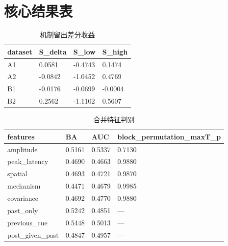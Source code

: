 \documentclass[UTF8,a4paper,11pt]{ctexart}
\begin{document}
\section{核心结果表}

\begin{longtable}{llll}

\caption{机制留出差分收益}\\\toprule

dataset & S\_delta & S\_low & S\_high\\\midrule

A1 & 0.0581 & -0.4743 & 0.1474\\

A2 & -0.0842 & -1.0452 & 0.4769\\

B1 & -0.0176 & -0.0699 & -0.0004\\

B2 & 0.2562 & -1.1102 & 0.5607\\

\bottomrule\end{longtable}

\begin{longtable}{llll}

\caption{合并特征判别}\\\toprule

features & BA & AUC & block\_permutation\_maxT\_p\\\midrule

amplitude & 0.5161 & 0.5337 & 0.7130\\

peak\_latency & 0.4690 & 0.4663 & 0.9880\\

spatial & 0.4693 & 0.4721 & 0.9870\\

mechanism & 0.4471 & 0.4679 & 0.9985\\

covariance & 0.4692 & 0.4770 & 0.9880\\

past\_only & 0.5242 & 0.4851 & —\\

previous\_cue & 0.5448 & 0.5013 & —\\

post\_given\_past & 0.4847 & 0.4957 & —\\

\bottomrule\end{longtable}
\end{document}
